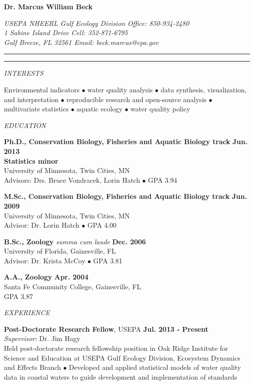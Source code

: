 \documentclass[letterpaper,12pt]{article}
\newcommand{\sectitle}[1]{\vspace{\baselineskip} \centerline{\large{\textit{#1}}}}
\begin{document}
\raggedright

\LARGE
\centerline{{\bf Dr. Marcus William Beck}}
\normalsize
\textit{USEPA NHEERL Gulf Ecology Division \hfill Office: 850-934-2480 \\
1 Sabine Island Drive \hfill Cell: 352-871-6795 \\
Gulf Breeze, FL 32561 \hfill Email: beck.marcus@epa.gov}
\vspace{4pt}
\hrule
\vspace{2pt}
\hrule
\vspace{4pt}

\sectitle{INTERESTS}

Environmental indicators $\bullet$ water quality analysis $\bullet$ data synthesis, visualization, and interpretation $\bullet$ reproducible research and open-source analysis $\bullet$ multivariate statistics $\bullet$ aquatic ecology $\bullet$ water quality policy

\sectitle{EDUCATION}

{\bf Ph.D., Conservation Biology, Fisheries and Aquatic Biology track} \hfill {\bf Jun. 2013} \\
{\bf Statistics minor} \\
University of Minnesota, Twin Cities, MN \\
Advisors: Drs. Bruce Vondracek, Lorin Hatch $\bullet$ GPA 3.94 

{\bf M.Sc., Conservation Biology, Fisheries and Aquatic Biology track} \hfill {\bf Jun. 2009} \\
University of Minnesota, Twin Cities, MN \\
Advisor: Dr. Lorin Hatch $\bullet$ GPA 4.00

{\bf B.Sc., Zoology} \textit{summa cum laude} \hfill {\bf Dec. 2006} \\
University of Florida, Gainesville, FL \\
Advisor: Dr. Krista McCoy $\bullet$ GPA 3.81

{\bf A.A., Zoology} \hfill {\bf Apr. 2004} \\
Santa Fe Community College, Gainesville, FL \\
GPA 3.87

\sectitle{EXPERIENCE}

{\bf Post-Doctorate Research Fellow}, USEPA \hfill {\bf Jul. 2013 - Present}\\
\textit{Supervisor}: Dr. Jim Hagy \\
Held post-doctorate research fellowship position in Oak Ridge Institute for Science and Education at USEPA Gulf Ecology Division, Ecosystem Dynamics and Effects Branch $\bullet$ Developed and applied statistical models of water quality data in coastal waters to guide development and implementation of standards
\end{document}
